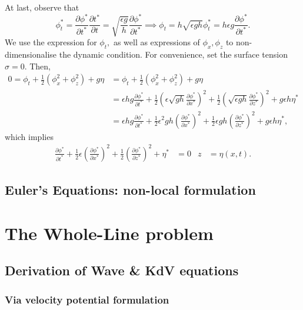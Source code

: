 \documentclass[10pt,reqno,oneside,a4paper]{article}
\begin{document}
At last, observe that 
\[ 
\phi^*_t = \frac{\partial \phi^*}{\partial t^*} \frac{\partial t^*}{\partial t} =  \sqrt{\frac{\epsilon g}{h}} \frac{\partial \phi^*}{\partial t^*} \implies \phi_t = h \sqrt{\epsilon g h}\phi^*_t = h\epsilon g \frac{\partial \phi^*}{\partial t^*}.
\]
We use the expression for $\phi_t,$ as well as expressions of $\phi_x, \phi_z$ to non-dimensionalise the dynamic condition. For convenience, set the surface tension $\sigma =0.$ Then,
\begin{align*}
0 = \phi_t + \frac{1}{2} (\phi_x^2 + \phi_z^2) + g\eta &=  \phi_t + \frac{1}{2} (\phi_x^2 + \phi_z^2) + g\eta \\
&= \epsilon h g \frac{\partial \phi^*}{\partial t^*} + \frac{1}{2} \left( \epsilon\sqrt{g h} \frac{\partial \phi^*}{\partial x^*}\right)^2 +  \frac{1}{2}\left(\sqrt{\epsilon g h} \frac{\partial \phi^*}{\partial z^*}\right)^2 + g \epsilon h \eta^* \\
&= \epsilon h g \frac{\partial \phi^*}{\partial t^*} + \frac{1}{2}  \epsilon^2 g h \left(\frac{\partial \phi^*}{\partial x^*}\right)^2 +  \frac{1}{2} \epsilon g h \left(\frac{\partial \phi^*}{\partial z^*}\right)^2 + g \epsilon h \eta^*,
\end{align*}
which implies 
\begin{align*}
\frac{\partial \phi^*}{\partial t^*} + \frac{1}{2}  \epsilon \left(\frac{\partial \phi^*}{\partial x^*}\right)^2 +  \frac{1}{2} \left(\frac{\partial \phi^*}{\partial z^*}\right)^2 + \eta^*  &= 0 &z &= \eta(x, t).
\end{align*}

\subsection{Euler's Equations: non-local formulation}

\section{The Whole-Line problem}

\subsection{Derivation of Wave \& KdV equations}

\subsubsection{Via velocity potential formulation}
\end{document}

